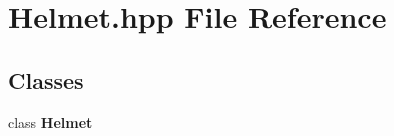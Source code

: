 \section{Helmet.\-hpp File Reference}
\label{_helmet_8hpp}
\subsection*{Classes}
\begin{DoxyCompactItemize}
\item 
class {\bf Helmet}
\end{DoxyCompactItemize}
